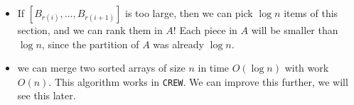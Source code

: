 \begin{itemize}
    \item If $[B_{r(i)}, \dots, B_{r(i + 1)}]$ is too large, then we can
        pick $\log n$ items of this section, and we can rank them in $A$!
        Each piece in $A$ will be smaller than $\log n$, since the partition
        of $A$ was already $\log n$.

    \item we can merge two sorted arrays of size $n$ in time $O(\log n)$
        with work $O(n)$.  This algorithm works in \texttt{CREW}.
        We can improve this  further, we will see this later.
\end{itemize}

